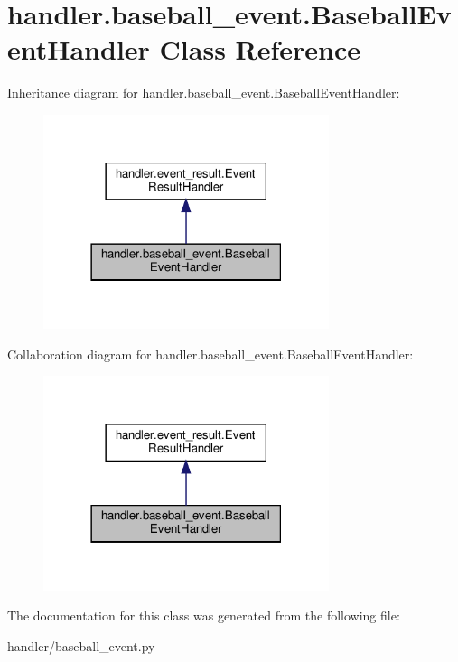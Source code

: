 \hypertarget{classhandler_1_1baseball__event_1_1_baseball_event_handler}{}\section{handler.\+baseball\+\_\+event.\+Baseball\+Event\+Handler Class Reference}
\label{classhandler_1_1baseball__event_1_1_baseball_event_handler}


Inheritance diagram for handler.\+baseball\+\_\+event.\+Baseball\+Event\+Handler\+:\nopagebreak
\begin{figure}[H]
\begin{center}
\leavevmode
\includegraphics[width=237pt]{classhandler_1_1baseball__event_1_1_baseball_event_handler__inherit__graph}
\end{center}
\end{figure}


Collaboration diagram for handler.\+baseball\+\_\+event.\+Baseball\+Event\+Handler\+:\nopagebreak
\begin{figure}[H]
\begin{center}
\leavevmode
\includegraphics[width=237pt]{classhandler_1_1baseball__event_1_1_baseball_event_handler__coll__graph}
\end{center}
\end{figure}


The documentation for this class was generated from the following file\+:\begin{DoxyCompactItemize}
\item 
handler/baseball\+\_\+event.\+py\end{DoxyCompactItemize}
